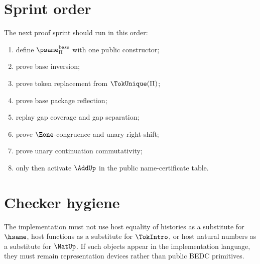 \section{Sprint order}
The next proof sprint should run in this order:
\begin{enumerate}
  \item define \(\psame_{\Pi}^{\mathrm{base}}\) with one public constructor;
  \item prove base inversion;
  \item prove token replacement from \(\TokUnique(\Pi)\);
  \item prove base package reflection;
  \item replay gap coverage and gap separation;
  \item prove \(\Eone\)-congruence and unary right-shift;
  \item prove unary continuation commutativity;
  \item only then activate \(\AddUp\) in the public name-certificate table.
\end{enumerate}

\section{Checker hygiene}
The implementation must not use host equality of histories as a substitute for \(\hsame\), host functions as a substitute for \(\TokIntro\), or host natural numbers as a substitute for \(\NatUp\). If such objects appear in the implementation language, they must remain representation devices rather than public BEDC primitives.
